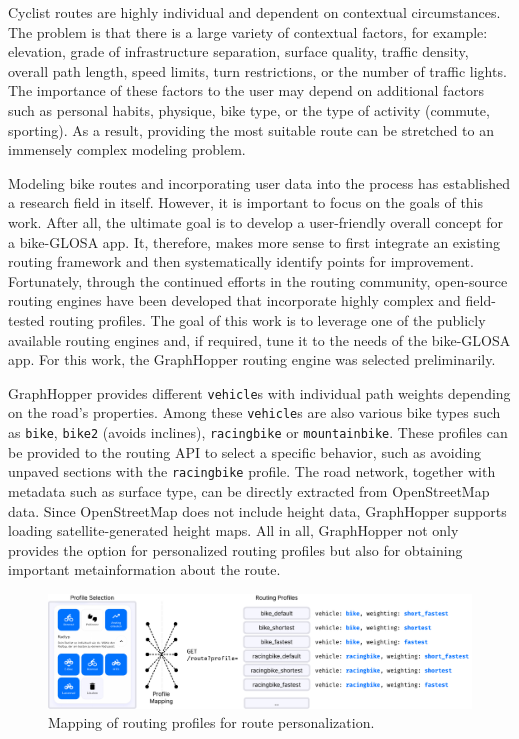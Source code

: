 Cyclist routes are highly individual and dependent on contextual circumstances. The problem is that there is a large variety of contextual factors, for example: elevation, grade of infrastructure separation, surface quality, traffic density, overall path length, speed limits, turn restrictions, or the number of traffic lights. The importance of these factors to the user may depend on additional factors such as personal habits, physique, bike type, or the type of activity (commute, sporting). As a result, providing the most suitable route can be stretched to an immensely complex modeling problem.

Modeling bike routes and incorporating user data into the process has established a research field in itself. However, it is important to focus on the goals of this work. After all, the ultimate goal is to develop a user-friendly overall concept for a bike-GLOSA app. It, therefore, makes more sense to first integrate an existing routing framework and then systematically identify points for improvement. Fortunately, through the continued efforts in the routing community, open-source routing engines have been developed that incorporate highly complex and field-tested routing profiles. The goal of this work is to leverage one of the publicly available routing engines and, if required, tune it to the needs of the bike-GLOSA app. For this work, the GraphHopper routing engine was selected preliminarily.

GraphHopper provides different \texttt{vehicle}s with individual path weights depending on the road's properties. Among these \texttt{vehicle}s are also various bike types such as \texttt{bike}, \texttt{bike2} (avoids inclines), \texttt{racingbike} or \texttt{mountainbike}. These profiles can be provided to the routing API to select a specific behavior, such as avoiding unpaved sections with the \texttt{racingbike} profile. The road network, together with metadata such as surface type, can be directly extracted from OpenStreetMap data. Since OpenStreetMap does not include height data, GraphHopper supports loading satellite-generated height maps. All in all, GraphHopper not only provides the option for personalized routing profiles but also for obtaining important metainformation about the route.

\begin{figure}[htbp]
\centering
\includegraphics[width=\linewidth]{images/routing-profile-mapping.pdf}
\caption{Mapping of routing profiles for route personalization.}
\label{fig:routing-profile-mapping}
\end{figure}

